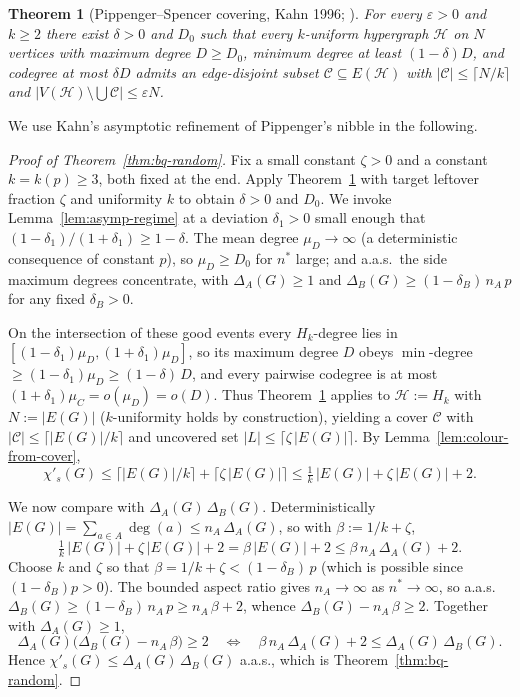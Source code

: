 \documentclass[11pt,a4paper]{article}
\newtheorem{theorem}{Theorem}[section]
\theoremstyle{definition}
\theoremstyle{remark}
\begin{document}
\begin{theorem}[Pippenger--Spencer covering, Kahn 1996;
\cite{kahnAsymptoticEdgeColoring1996}]
\label{thm:pippenger-spencer}
For every $\varepsilon > 0$ and $k \geq 2$ there exist $\delta > 0$
and $D_0$ such that every $k$-uniform hypergraph $\mathcal{H}$ on $N$
vertices with maximum degree $D \geq D_0$, minimum degree at least
$(1 - \delta)D$, and codegree at most $\delta D$ admits an
edge-disjoint subset $\mathcal{C} \subseteq E(\mathcal{H})$ with
$|\mathcal{C}| \leq \lceil N/k \rceil$ and
$|V(\mathcal{H}) \setminus \bigcup \mathcal{C}| \leq \varepsilon N$.
\end{theorem}

We use Kahn's asymptotic refinement of Pippenger's nibble in the following.

\begin{proof}[Proof of Theorem~\ref{thm:bq-random}]
Fix a small constant $\zeta > 0$ and a constant $k = k(p) \geq 3$,
both fixed at the end. Apply Theorem~\ref{thm:pippenger-spencer}
with target leftover fraction $\zeta$ and uniformity $k$ to obtain
$\delta > 0$ and $D_0$. We invoke Lemma~\ref{lem:asymp-regime} at a deviation $\delta_1 > 0$
small enough that $(1 - \delta_1)/(1 + \delta_1) \geq 1 - \delta$. The
mean degree $\mu_D \to \infty$ (a deterministic consequence of constant
$p$), so $\mu_D \geq D_0$ for $n^*$ large; and a.a.s.\ the side maximum
degrees concentrate, with $\Delta_A(G) \geq 1$ and
$\Delta_B(G) \geq (1 - \delta_B)\,n_A\,p$ for any fixed $\delta_B > 0$.

On the intersection of these good events every $H_k$-degree lies in
$[(1-\delta_1)\mu_D, (1+\delta_1)\mu_D]$, so its maximum degree $D$
obeys $\min$-degree $\geq (1-\delta_1)\mu_D \geq (1-\delta)\,D$, and
every pairwise codegree is at most $(1+\delta_1)\mu_C = o(\mu_D) = o(D)$.
Thus Theorem~\ref{thm:pippenger-spencer} applies to $\mathcal{H} := H_k$
with $N := |E(G)|$ ($k$-uniformity holds by construction), yielding a
cover $\mathcal{C}$ with
$|\mathcal{C}| \leq \lceil |E(G)|/k \rceil$ and uncovered set
$|L| \leq \lceil \zeta\,|E(G)| \rceil$. By
Lemma~\ref{lem:colour-from-cover},
\[
\chi'_s(G)
\leq \lceil |E(G)|/k \rceil + \lceil \zeta\,|E(G)| \rceil
\leq \tfrac{1}{k}\,|E(G)| + \zeta\,|E(G)| + 2.
\]

We now compare with $\Delta_A(G)\,\Delta_B(G)$. Deterministically
$|E(G)| = \sum_{a \in A} \deg(a) \leq n_A\,\Delta_A(G)$, so with
$\beta := 1/k + \zeta$,
\[
\tfrac{1}{k}\,|E(G)| + \zeta\,|E(G)| + 2
= \beta\,|E(G)| + 2
\leq \beta\,n_A\,\Delta_A(G) + 2.
\]
Choose $k$ and $\zeta$ so that $\beta = 1/k + \zeta < (1-\delta_B)\,p$
(which is possible since $(1-\delta_B)p > 0$). The bounded aspect ratio gives
$n_A \to \infty$ as $n^* \to \infty$, so a.a.s.\
$\Delta_B(G) \geq (1-\delta_B)\,n_A\,p \geq n_A\,\beta + 2$, whence
$\Delta_B(G) - n_A\,\beta \geq 2$. Together with $\Delta_A(G) \geq 1$,
\[
\Delta_A(G)\bigl(\Delta_B(G) - n_A\,\beta\bigr) \geq 2
\quad\Longleftrightarrow\quad
\beta\,n_A\,\Delta_A(G) + 2 \leq \Delta_A(G)\,\Delta_B(G).
\]
Hence $\chi'_s(G) \leq \Delta_A(G)\,\Delta_B(G)$ a.a.s., which is
Theorem~\ref{thm:bq-random}.
\end{proof}
\end{document}
